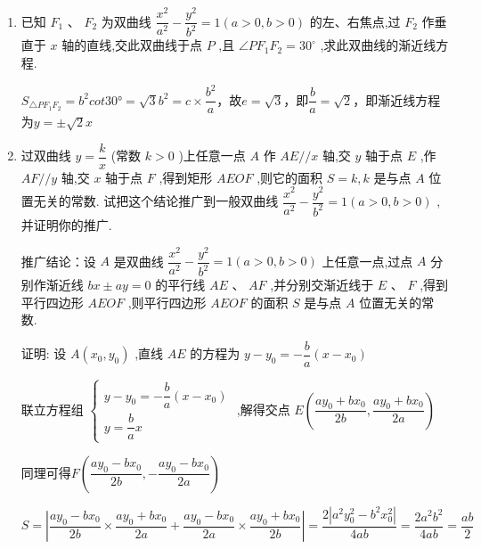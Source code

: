 \begin{enumerate}
\begin{jieda}
\begin{enumerate}
\begin{dingautolist}{172}
                由 ${k}^{2} > 1$ 得： $\therefore \vv{OA} \cdot  \vv{OB} = 2 + \dfrac{4}{{k}^{2} - 1} > 2$
            \end{dingautolist}
            综上所述, $\vv{OA} \cdot  \vv{OB}$ 的最小值为 2
        \end{enumerate}
    \end{jieda}
    \item 已知 ${F}_{1}\text{ 、 }{F}_{2}$ 为双曲线 $\dfrac{{x}^{2}}{{a}^{2}} - \dfrac{{y}^{2}}{{b}^{2}} = 1\left( {a > 0,b > 0}\right)$ 的左、右焦点,过 ${F}_{2}$ 作垂直于 $x$ 轴的直线,交此双曲线于点 $P$ ,且 $\angle P{F}_{1}{F}_{2} = {30}^{ \circ  }$ ,求此双曲线的渐近线方程.
    \begin{jieda}
        $S_{\triangle PF_1F_2} = b^2cot\ang{30} = \sqrt{3}b^2 = c \times \dfrac{b^2}{a}$，故$e = \sqrt{3}$，即$\dfrac{b}{a} = \sqrt{2}$，即渐近线方程为$y = \pm \sqrt{2}x$
    \end{jieda}
    \item 过双曲线 $y = \dfrac{k}{x}$ (常数 $k > 0$ )上任意一点 $A$ 作 ${AE}//x$ 轴,交 $y$ 轴于点 $E$ ,作 ${AF}//y$ 轴,交 $x$ 轴于点 $F$ ,得到矩形 ${AEOF}$ ,则它的面积 $S = k,k$ 是与点 $A$ 位置无关的常数. 试把这个结论推广到一般双曲线 $\dfrac{{x}^{2}}{{a}^{2}} - \dfrac{{y}^{2}}{{b}^{2}} = 1\left( {a > 0,b > 0}\right)$ ,并证明你的推广.
    \begin{jieda}
        推广结论：设 $A$ 是双曲线 $\dfrac{{x}^{2}}{{a}^{2}} - \dfrac{{y}^{2}}{{b}^{2}} = 1\left( {a > 0,b > 0}\right)$ 上任意一点,过点 $A$ 分别作渐近线 ${bx} \pm  {ay} = 0$ 的平行线 ${AE}$ 、 ${AF}$ ,并分别交渐近线于 $E$ 、 $F$ ,得到平行四边形 ${AEOF}$ ,则平行四边形 ${AEOF}$ 的面积 $S$ 是与点 $A$ 位置无关的常数.
    
        证明: 设 $A\left( {{x}_{0},{y}_{0}}\right)$ ,直线 ${AE}$ 的方程为 $y - {y}_{0} =  - \dfrac{b}{a}\left( {x - {x}_{0}}\right)$ 
        
        联立方程组 $\left\{  \begin{array}{l} y - {y}_{0} =  - \dfrac{b}{a}\left( {x - {x}_{0}}\right) \\  y = \dfrac{b}{a}x \end{array}\right.$ ,解得交点 $E\left( {\dfrac{a{y}_{0} + b{x}_{0}}{2b},\dfrac{a{y}_{0} + b{x}_{0}}{2a}}\right)$ 
        
        同理可得$F\left( {\dfrac{a{y}_{0} - b{x}_{0}}{2b}, -\dfrac{a{y}_{0} - b{x}_{0}}{2a}}\right)$

        $S = \left|\dfrac{a{y}_{0} - b{x}_{0}}{2b} \times \dfrac{a{y}_{0} + b{x}_{0}}{2a} + \dfrac{a{y}_{0} - b{x}_{0}}{2a} \times \dfrac{a{y}_{0} + b{x}_{0}}{2b}\right| = \dfrac{2|a^2y_0^2-b^2x_0^2|}{4ab} = \dfrac{2a^2b^2}{4ab} = \dfrac{ab}{2}$
        

\end{jieda}
\end{enumerate}
